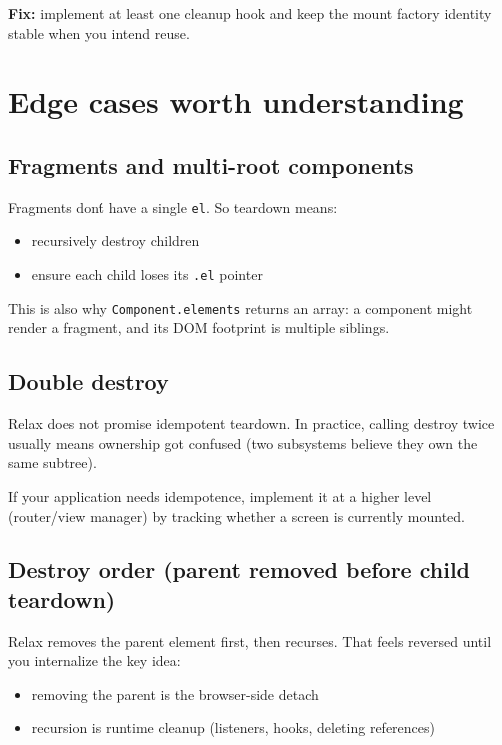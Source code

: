 	\textbf{Fix:} implement at least one cleanup hook and keep the mount factory identity stable when you intend reuse.

\section{Edge cases worth understanding}

\subsection{Fragments and multi-root components}

Fragments don\'t have a single \texttt{el}. So teardown means:

\begin{itemize}
  \item recursively destroy children
  \item ensure each child loses its \texttt{.el} pointer
\end{itemize}

This is also why \texttt{Component.elements} returns an array: a component might render a fragment, and its DOM footprint is multiple siblings.

\subsection{Double destroy}

Relax does not promise idempotent teardown.
In practice, calling destroy twice usually means ownership got confused (two subsystems believe they own the same subtree).

If your application needs idempotence, implement it at a higher level (router/view manager) by tracking whether a screen is currently mounted.

\subsection{Destroy order (parent removed before child teardown)}

Relax removes the parent element first, then recurses.
That feels reversed until you internalize the key idea:

\begin{itemize}
  \item removing the parent is the browser-side detach
  \item recursion is runtime cleanup (listeners, hooks, deleting references)
\end{itemize}

